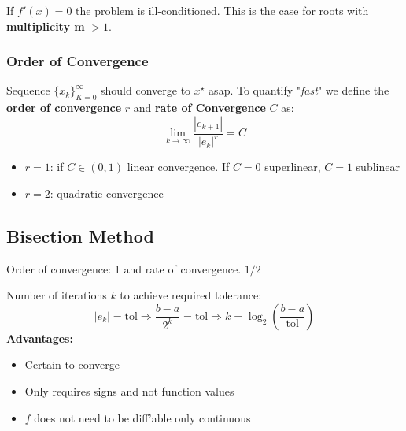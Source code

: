         If $f'(x)=0$ the problem is ill-conditioned. This is the case for roots with \textbf{multiplicity m} $> 1$.
        
        \subsubsection{Order of Convergence}
            Sequence $\{x_k\}_{K=0}^{\infty}$ should converge to $x^\star$ asap. To quantify "\textit{fast}" we define the \textbf{order of convergence} $r$ and \textbf{rate of Convergence} $C$ as:
            \begin{equation*}
                \lim_{k\to\infty}\frac{|e_{k+1}|}{|e_k|^r}= C
            \end{equation*}
            \begin{itemize}
                \item $r=1$: if $C\in(0,1)$ linear convergence. If $C = 0$ superlinear, $C = 1$ sublinear
                \item $r=2$: quadratic convergence
            \end{itemize}{}

\subsection{Bisection Method}
    Order of convergence: 1 and rate of convergence. $1/2$
    
    Number of iterations $k$ to achieve required tolerance:
    \begin{equation*}
        |e_k| = \textrm{tol} \Rightarrow \frac{b-a}{2^k}=\textrm{tol} \Rightarrow k = \log_2\left(\frac{b-a}{\textrm{tol}}\right)
    \end{equation*}
    \textbf{Advantages:}
    \begin{itemize}
        \item Certain to converge
        \item Only requires signs and not function values
        \item $f$ does not need to be diff'able only continuous
    \end{itemize}
    
